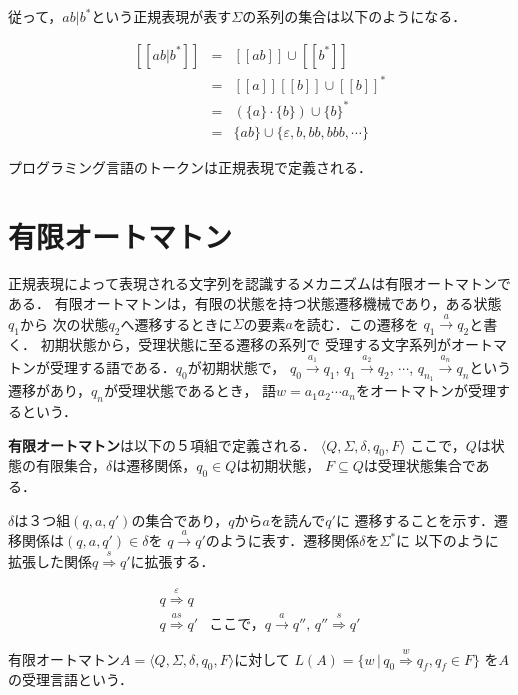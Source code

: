 \documentclass[dvipdfmx,a4j]{jbook}
\begin{document}
従って，$ab|b^\ast$という正規表現が表す$\Sigma$の系列の集合は以下のようになる．

\[\begin{array}{rcl}[\![ab|b^\ast]\!] & = & [\![ab]\!]\cup[\![b^\ast]\!]\\
  & = & [\![a]\!][\![b]\!]\cup [\![b]\!]^\ast\\
  & = & (\{a\}\cdot\{b\})\cup\{b\}^\ast\\
  & = & \{ab\}\cup\{\varepsilon,b,bb,bbb,\cdots\}
\end{array}\]

プログラミング言語のトークンは正規表現で定義される．

\section{有限オートマトン}

正規表現によって表現される文字列を認識するメカニズムは有限オートマトンである．
有限オートマトンは，有限の状態を持つ状態遷移機械であり，ある状態$q_1$から
次の状態$q_2$へ遷移するときに$\Sigma$の要素$a$を読む．この遷移を
$q_1\xrightarrow{a}q_2$と書く．
初期状態から，受理状態に至る遷移の系列で
受理する文字系列がオートマトンが受理する語である．$q_0$が初期状態で，
$q_0\xrightarrow{a_1}q_1$, $q_1\xrightarrow{a_2}q_2$, $\cdots$,
$q_{n_1}\xrightarrow{a_n}q_n$という遷移があり，$q_n$が受理状態であるとき，
語$w=a_1a_2\cdots a_n$をオートマトンが受理するという．

\begin{Def}
  {\bf 有限オートマトン}は以下の５項組で定義される．
  $\langle Q,\Sigma,\delta,q_0,F\rangle$
  ここで，$Q$は状態の有限集合，$\delta$は遷移関係，$q_0\in Q$は初期状態，
  $F\subseteq Q$は受理状態集合である．
\end{Def}

  $\delta$は３つ組$(q,a,q')$の集合であり，$q$から$a$を読んで$q'$に
  遷移することを示す．遷移関係は$(q,a,q')\in\delta$を
  $q\xrightarrow{a}q'$のように表す．遷移関係$\delta$を$\Sigma^\ast$に
  以下のように拡張した関係$q\stackrel{s}{\Rightarrow}q'$に拡張する．

  \[\begin{array}{ll}
    q\stackrel{\varepsilon}{\Rightarrow}q & \\
    q\stackrel{as}{\Rightarrow}q' & \mbox{ここで，$q\xrightarrow{a}q''$,
    $q''\stackrel{s}{\Rightarrow}q'$}
  \end{array}\]

  \begin{Def}
    有限オートマトン$A=\langle Q,\Sigma,\delta,q_0,F\rangle$に対して
    $L(A)=\{w\,|\,q_0\stackrel{w}{\Rightarrow}q_f, q_f\in F\}$
    を$A$の受理言語という．
  \end{Def}
\end{document}
